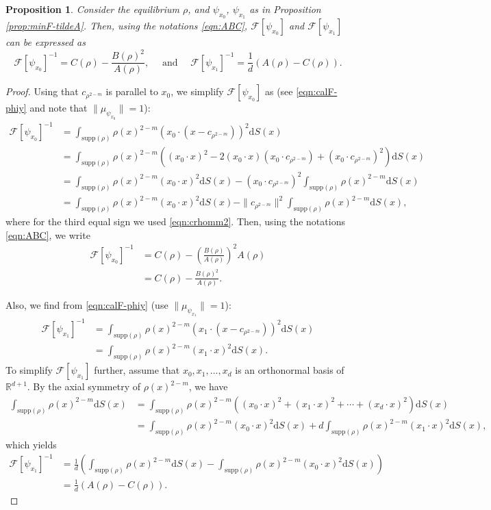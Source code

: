 \documentclass[11pt]{amsart}
\newtheorem{proposition}{Proposition}[section]
\newcommand{\bbr}{\mathbb R}
\newcommand{\dx}{\mathrm{d}S (x)}
\newcommand{\supp}{\mathrm{supp}(\rho)}
\newcommand{\dm}{d} %
\begin{document}
\begin{proposition} 
\label{prop:calF-x0x1-ABC}
Consider the equilibrium $\rho$, and $\psi_{x_0}$, $\psi_{x_1}$ as in Proposition \ref{prop:minF-tildeA}. Then, using the notations \eqref{eqn:ABC}, $\mathcal{F}[\psi_{x_0}]$ and $\mathcal{F}[\psi_{x_1}]$ can be expressed as
\begin{equation}
\label{eqn:calF-x0x1-ABC}
\mathcal{F}[\psi_{x_0}]^{-1}=C(\rho)-\frac{B(\rho)^2}{A(\rho)},\quad \text{ and } \quad \mathcal{F}[\psi_{x_1}]^{-1}=\frac{1}{\dm}(A(\rho)-C(\rho)).
\end{equation}
\end{proposition}
\begin{proof}
Using that $c_{\rho^{2-m}}$ is parallel to $x_0$, we simplify $\mathcal{F}[\psi_{x_0}]$ as (see \eqref{eqn:calF-phiy} and note that $\|\mu_{\psi_{x_0}}\|= 1$):
\begin{align*}
\mathcal{F}[\psi_{x_0}]^{-1}&=\int_{\supp}\rho(x)^{2-m}(x_0\cdot(x-c_{\rho^{2-m}}))^2\dx\\
&=\int_{\supp}\rho(x)^{2-m}\left((x_0\cdot x)^2-2(x_0\cdot x)(x_0\cdot c_{\rho^{2-m}})+(x_0\cdot c_{\rho^{2-m}})^2\right)\dx\\
&=\int_{\supp}\rho(x)^{2-m}(x_0\cdot x)^2\dx-(x_0\cdot c_{\rho^{2-m}})^2\int_{\supp}\rho(x)^{2-m}\dx\\
&=\int_{\supp}\rho(x)^{2-m}(x_0\cdot x)^2\dx-\|c_{\rho^{2-m}}\|^2\int_{\supp}\rho(x)^{2-m}\dx,
\end{align*}
where for the third equal sign we used \eqref{eqn:crhomm2}. Then, using the notations \eqref{eqn:ABC}, we write
\begin{align*}
\mathcal{F}[\psi_{x_0}]^{-1} &=C(\rho)-\left(\frac{B(\rho)}{A(\rho)}\right)^2A(\rho)\\
&=C(\rho)-\frac{B(\rho)^2}{A(\rho)}.
\end{align*}

Also, we find from \eqref{eqn:calF-phiy} (use $\|\mu_{\psi_{x_1}}\| = 1$):
\begin{align*}
\mathcal{F}[\psi_{x_1}]^{-1}&=\int_{\supp}\rho(x)^{2-m}(x_1\cdot(x-c_{\rho^{2-m}}))^2\dx\\
&=\int_{\supp}\rho(x)^{2-m}(x_1\cdot x)^2\dx.
\end{align*}
To simplify $\mathcal{F}[\psi_{x_1}]$ further, assume that $x_0, x_1, ..., x_\dm$ is an orthonormal basis of $\bbr^{\dm+1}$. By the axial symmetry of $\rho(x)^{2-m}$, we have
\begin{align*}
\int_{\supp}\rho(x)^{2-m}\dx&=\int_{\supp}\rho(x)^{2-m}\left((x_0\cdot x)^2+(x_1\cdot x)^2+\cdots+(x_\dm\cdot x)^2\right)\dx\\
&=\int_{\supp}\rho(x)^{2-m}(x_0\cdot x)^2\dx+\dm\int_{\supp}\rho(x)^{2-m}(x_1\cdot x)^2\dx,
\end{align*}
which yields
\begin{align*}
\mathcal{F}[\psi_{x_1}]^{-1}&=\frac{1}{\dm}\left(\int_{\supp}\rho(x)^{2-m}\dx-\int_{\supp}\rho(x)^{2-m}(x_0\cdot x)^2\dx\right)\\[2pt]
&=\frac{1}{\dm}\left(A(\rho)-C(\rho)\right).
\end{align*}
\end{proof}
\end{document}

